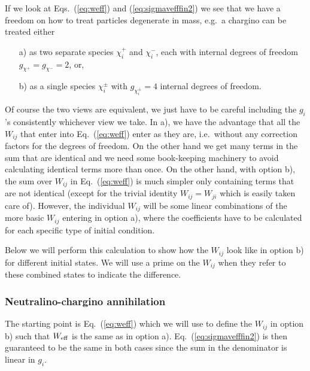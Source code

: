 \documentclass[a4paper,10pt,oneside]{book}
\begin{document}
If we look at Eqs.~(\ref{eq:weff}) and (\ref{eq:sigmavefffin2}) we see
that we have a freedom on how to treat particles degenerate in mass,
e.g.\ a chargino can be treated either 
\begin{enumerate}
\item[a)]
  as two separate species
  $\chi_{i}^+$ and $\chi_{i}^-$, each with internal degrees of freedom
  $g_{\chi^+}=g_{\chi^-}=2$, or,
\item[b)]
  as a single species
  $\chi_{i}^\pm$ with $g_{\chi_{i}^\pm}=4$ internal degrees of freedom. 
\end{enumerate}
Of course the two views are equivalent, we just have to be careful 
including the $g_{i}$'s consistently whichever view we take.
In a), we have the advantage that all the $W_{ij}$ that enter into 
Eq.~(\ref{eq:weff}) enter as they are, i.e.\ without any correction 
factors for the degrees of freedom. On the other hand we get many 
terms in the sum that are identical and we need some book-keeping 
machinery to avoid calculating identical terms more than once. On the 
other hand, with option b), the sum over $W_{ij}$ in Eq.~(\ref{eq:weff}) 
is much simpler only containing terms that are not identical (except 
for the trivial identity $W_{ij}=W_{ji}$ which is easily taken care of). 
However, the individual $W_{ij}$ will be some linear combinations of 
the more basic $W_{ij}$ entering in option a), where the coefficients 
have to be calculated for each specific type of initial condition. 

Below we will perform this calculation to show how the $W_{ij}$ look 
like in option b) for different initial states. We will use a prime on 
the $W_{ij}$ when they refer to these combined states to indicate the 
difference.

\subsubsection{Neutralino-chargino annihilation}

The starting point is Eq.~(\ref{eq:weff}) which we will use to define 
the $W_{ij}$ in option b) such that $W_{\rm eff}$ is the same as in 
option a). Eq.~(\ref{eq:sigmavefffin2}) is then guaranteed to be the 
same in both cases since the sum in the denominator is linear in $g_{i}$.
\end{document}
